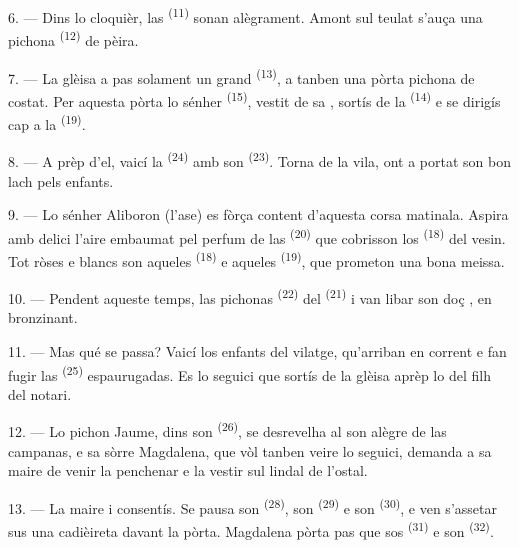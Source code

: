 6. --- Dins lo cloquièr, las  \textsuperscript{(11)} sonan
alègrament. Amont sul teulat s'auça una pichona 
\textsuperscript{(12)} de pèira.

7. --- La glèisa a pas solament un grand  \textsuperscript{(13)}, a
tanben una pòrta pichona de costat. Per aquesta pòrta lo sénher 
\textsuperscript{(15)}, vestit de sa , sortís de la
 \textsuperscript{(14)} e se dirigís cap a la 
\textsuperscript{(19)}.

8. --- A prèp d'el, vaicí la  \textsuperscript{(24)} amb son
 \textsuperscript{(23)}. Torna de la vila, ont a portat son bon lach
pels enfants.

\VUsaut{4.0mm}
\VUsaut{3.4mm}

9. --- Lo sénher Aliboron (l'ase) es fòrça content d'aquesta corsa matinala.
Aspira amb delici l'aire embaumat pel perfum de las 
\textsuperscript{(20)} que cobrisson los 
\textsuperscript{(18)} del  vesin. Tot ròses e blancs son aqueles
 \textsuperscript{(18)} e aqueles 
\textsuperscript{(19)}, que prometon una bona meissa.

10. --- Pendent aqueste temps, las pichonas 
\textsuperscript{(22)} del  \textsuperscript{(21)} i van libar son
doç , en bronzinant.

11. --- Mas qué se passa? Vaicí los enfants del vilatge, qu'arriban en corrent e
fan fugir las  \textsuperscript{(25)} espaurugadas. Es lo seguici que
sortís de la glèisa aprèp lo  del filh del notari.

12. --- Lo pichon Jaume, dins son  \textsuperscript{(26)}, se
desrevelha al son alègre de las campanas, e sa sòrre Magdalena, que vòl tanben
veire lo seguici, demanda a sa maire de venir la penchenar e la vestir sul lindal
de l'ostal.

13. --- La maire i consentís. Se pausa son 
\textsuperscript{(28)}, son  \textsuperscript{(29)} e son
 \textsuperscript{(30)}, e ven s'assetar sus una cadièireta
davant la pòrta. Magdalena pòrta pas que sos 
\textsuperscript{(31)} e son  \textsuperscript{(32)}.

